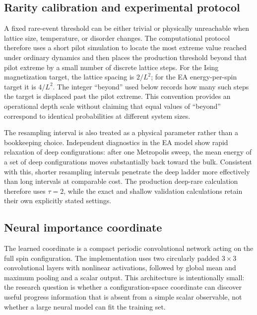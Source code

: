 \documentclass[a4paper,fleqn]{cas-sc}
\begin{document}
\subsection{Rarity calibration and experimental protocol}
A fixed rare-event threshold can be either trivial or physically unreachable when lattice size, temperature, or disorder changes. The computational protocol therefore uses a short pilot simulation to locate the most extreme value reached under ordinary dynamics and then places the production threshold beyond that pilot extreme by a small number of discrete lattice steps. For the Ising magnetization target, the lattice spacing is $2/L^2$; for the EA energy-per-spin target it is $4/L^2$. The integer ``beyond'' used below records how many such steps the target is displaced past the pilot extreme. This convention provides an operational depth scale without claiming that equal values of ``beyond'' correspond to identical probabilities at different system sizes.

The resampling interval is also treated as a physical parameter rather than a bookkeeping choice. Independent diagnostics in the EA model show rapid relaxation of deep configurations: after one Metropolis sweep, the mean energy of a set of deep configurations moves substantially back toward the bulk. Consistent with this, shorter resampling intervals penetrate the deep ladder more effectively than long intervals at comparable cost. The production deep-rare calculation therefore uses $\tau=2$, while the exact and shallow validation calculations retain their own explicitly stated settings.

\subsection{Neural importance coordinate}
The learned coordinate is a compact periodic convolutional network acting on the full spin configuration. The implementation uses two circularly padded $3\times3$ convolutional layers with nonlinear activations, followed by global mean and maximum pooling and a scalar output. This architecture is intentionally small: the research question is whether a configuration-space coordinate can discover useful progress information that is absent from a simple scalar observable, not whether a large neural model can fit the training set.
\end{document}
